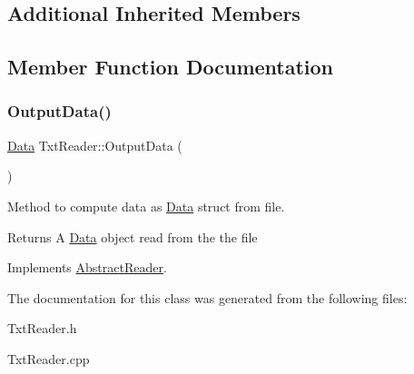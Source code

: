 \subsection*{Additional Inherited Members}


\subsection{Member Function Documentation}
\mbox{\label{class_txt_reader_a30786dcd83c2f24dd26e83cb5fd934ab}} 
\subsubsection{\texorpdfstring{Output\+Data()}{OutputData()}}
{\footnotesize\ttfamily \hyperlink{struct_data}{Data} Txt\+Reader\+::\+Output\+Data (\begin{DoxyParamCaption}{ }\end{DoxyParamCaption})\hspace{0.3cm}{\ttfamily [virtual]}}



Method to compute data as \hyperlink{struct_data}{Data} struct from file. 

\begin{DoxyReturn}{Returns}
A \hyperlink{struct_data}{Data} object read from the the file 
\end{DoxyReturn}


Implements \hyperlink{class_abstract_reader_a14b05f156920be0cfa0cabdb1c6c1267}{Abstract\+Reader}.



The documentation for this class was generated from the following files\+:\begin{DoxyCompactItemize}
\item 
Txt\+Reader.\+h\item 
Txt\+Reader.\+cpp\end{DoxyCompactItemize}
